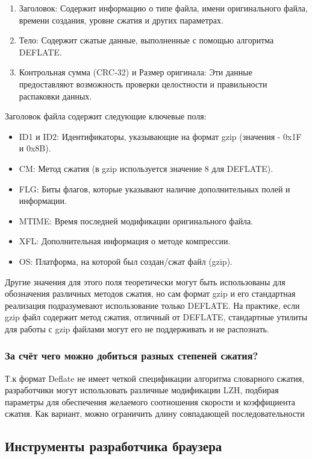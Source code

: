 \documentclass[12pt]{article}
\begin{document}
\begin{enumerate}
    \item Заголовок: Содержит информацию о типе файла, имени оригинального файла, времени создания, уровне сжатия и других параметрах.
    \item Тело: Содержит сжатые данные, выполненные с помощью алгоритма DEFLATE.
    \item Контрольная сумма (CRC-32) и Размер оригинала: Эти данные предоставляют возможность проверки целостности и правильности распаковки данных.
\end{enumerate}

Заголовок файла содержит следующие ключевые поля:

\begin{itemize}[label=-]
    \item ID1 и ID2: Идентификаторы, указывающие на формат gzip (значения - 0x1F и 0x8B).
    \item CM: Метод сжатия (в gzip используется значение 8 для DEFLATE). \*
    \item FLG: Биты флагов, которые указывают наличие дополнительных полей и информации.
    \item MTIME: Время последней модификации оригинального файла.
    \item XFL: Дополнительная информация о методе компрессии.
    \item OS: Платформа, на которой был создан/сжат файл (gzip).
\end{itemize}

Другие значения для этого поля теоретически могут быть использованы для обозначения
различных методов сжатия, но сам формат gzip и его стандартная реализация подразумевают
использование только DEFLATE. На практике, если gzip файл содержит метод сжатия,
отличный от DEFLATE, стандартные утилиты для работы с gzip файлами могут его не поддерживать
и не распознать.

\subsubsection{За счёт чего можно добиться разных степеней сжатия?}

Т.к формат Deflate не имеет четкой спецификации алгоритма словарного сжатия,
разработчики могут использовать различные модификации LZH, подбирая параметры для
обеспечения желаемого соотношения скорости и коэффициента сжатия.
Как вариант, можно ограничить длину совпадающей последовательности

\subsection{Инструменты разработчика браузера}
\end{document}
